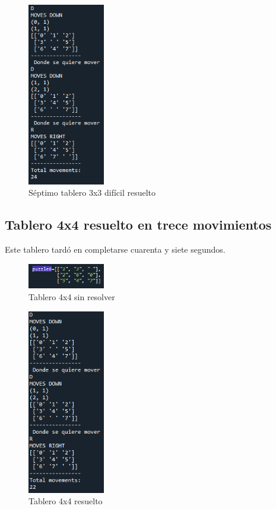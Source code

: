 \documentclass{article}
\begin{document}
        \begin{figure}[H]
        \centering
        \includegraphics[width=0.3\textwidth]{puzzles/puzzle7Solved.PNG}
        \caption{Séptimo tablero 3x3 difícil resuelto}
        \label{fig:ger}
        \end{figure}
        
    \subsection{Tablero 4x4 resuelto en trece movimientos}
    Este tablero tardó en completarse cuarenta y siete segundos.
        \begin{figure}[H]
        \centering
        \includegraphics[width=0.3\textwidth]{puzzles/puzzle6.PNG}
        \caption{Tablero 4x4 sin resolver}
        \label{fig:ger}
        \end{figure}
        
        \begin{figure}[H]
        \centering
        \includegraphics[width=0.3\textwidth]{puzzles/puzzle6Solved.PNG}
        \caption{Tablero 4x4 resuelto}
        \label{fig:ger}
        \end{figure}
        
\end{document}
